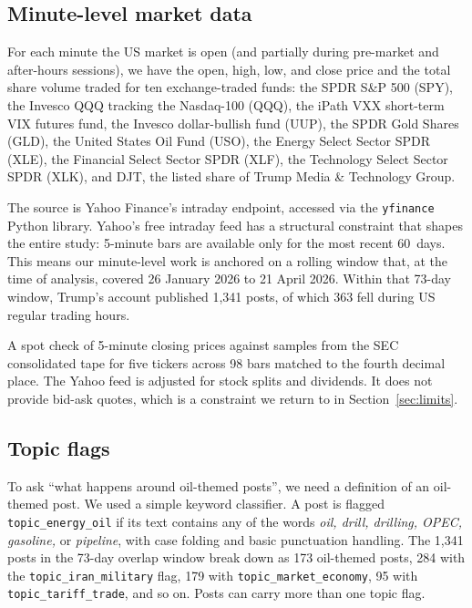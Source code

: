 \documentclass[11pt,a4paper]{article}
\begin{document}
\subsection{Minute-level market data}

For each minute the US market is open (and partially during pre-market and after-hours sessions), we have the open, high, low, and close price and the total share volume traded for ten exchange-traded funds: the SPDR S\&P 500 (SPY), the Invesco QQQ tracking the Nasdaq-100 (QQQ), the iPath VXX short-term VIX futures fund, the Invesco dollar-bullish fund (UUP), the SPDR Gold Shares (GLD), the United States Oil Fund (USO), the Energy Select Sector SPDR (XLE), the Financial Select Sector SPDR (XLF), the Technology Select Sector SPDR (XLK), and DJT, the listed share of Trump Media \& Technology Group.

The source is Yahoo Finance's intraday endpoint, accessed via the \texttt{yfinance} Python library. Yahoo's free intraday feed has a structural constraint that shapes the entire study: 5-minute bars are available only for the most recent 60~days. This means our minute-level work is anchored on a rolling window that, at the time of analysis, covered 26 January 2026 to 21 April 2026. Within that 73-day window, Trump's account published 1{,}341 posts, of which 363 fell during US regular trading hours.

A spot check of 5-minute closing prices against samples from the SEC consolidated tape for five tickers across 98 bars matched to the fourth decimal place. The Yahoo feed is adjusted for stock splits and dividends. It does not provide bid-ask quotes, which is a constraint we return to in Section~\ref{sec:limits}.

\subsection{Topic flags}

To ask ``what happens around oil-themed posts'', we need a definition of an oil-themed post. We used a simple keyword classifier. A post is flagged \texttt{topic\_energy\_oil} if its text contains any of the words \emph{oil, drill, drilling, OPEC, gasoline,} or \emph{pipeline}, with case folding and basic punctuation handling. The 1{,}341 posts in the 73-day overlap window break down as 173 oil-themed posts, 284 with the \texttt{topic\_iran\_military} flag, 179 with \texttt{topic\_market\_economy}, 95 with \texttt{topic\_tariff\_trade}, and so on. Posts can carry more than one topic flag.
\end{document}
